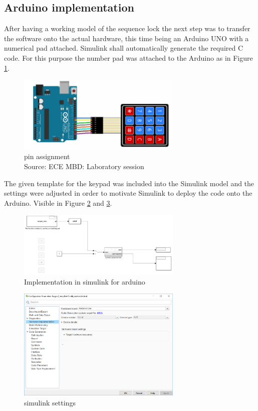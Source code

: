 		\subsection{Arduino implementation}
		After having a working model of the sequence lock the next step was to transfer the software onto the actual hardware, this time being an Arduino UNO with a numerical pad attached. Simulink shall automatically generate the required C code. For this purpose the number pad was attached to the Arduino as in Figure \ref{fig:ard_wir}.
			\begin{figure}[H]
					\centering
					\includegraphics[width=0.7\textwidth]{figures/arduino_wiring.png}
					\caption[pin assignment]{pin assignment \\Source: ECE MBD: Laboratory session}
					\label{fig:ard_wir}
			\end{figure}
		The given template for the keypad was included into the Simulink model and the settings were adjusted in order to motivate Simulink to deploy the code onto the Arduino. Visible in Figure \ref{fig:ard_imp} and \ref{fig:settings}.
			\begin{figure}[H]
					\centering
					\includegraphics[width=0.7\textwidth]{figures/arduino_implementation.png}
					\caption{Implementation in simulink for arduino}
					\label{fig:ard_imp}
			\end{figure}
			\begin{figure}[H]
					\centering
					\includegraphics[width=0.7\textwidth]{figures/simulink_settings.png}
					\caption{simulink settings}
					\label{fig:settings}
			\end{figure}
